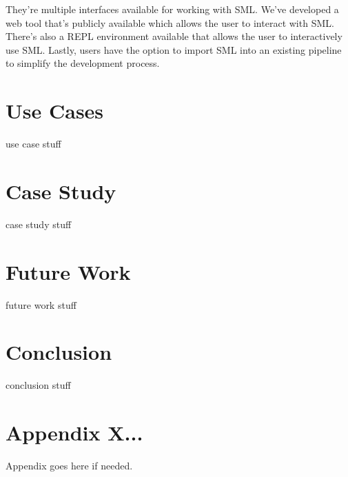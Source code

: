 \documentclass[jair,twoside,11pt,theapa]{article}
\begin{document}
They're multiple interfaces available for working with SML. We've developed a web tool that's publicly available which allows the user to interact with SML. There's also a REPL environment available that allows the user to interactively use SML. Lastly, users have the option to import SML into an existing pipeline to simplify the development process.

\section{Use Cases}
\label{use-cases}

use case stuff

\section{Case Study}
\label{case-study}
case study stuff

\section{Future Work}
\label{future-work}

future work stuff

\section{Conclusion}
\label{conclusion}
conclusion stuff


\appendix
\section*{Appendix X...}

Appendix goes here if needed.

\vskip 0.2in


\end{document}
